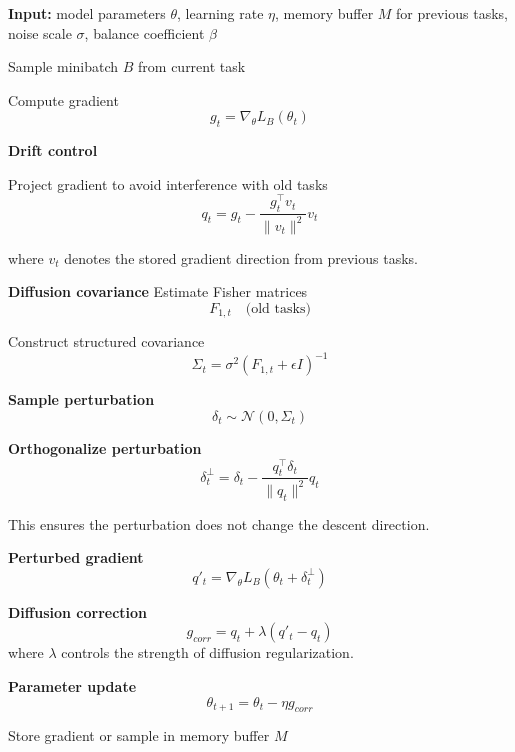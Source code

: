 \documentclass{article}
\begin{document}



\begin{algorithm}[t]
\caption{Drift–Diffusion Controlled Continual Learning (Perturbation Form)}
\label{alg:ddcl}
\begin{algorithmic}[1]

\STATE \textbf{Input:}
model parameters $\theta$,
learning rate $\eta$,
memory buffer $M$ for previous tasks,
noise scale $\sigma$,
balance coefficient $\beta$


\STATE Sample minibatch $B$ from current task

\STATE Compute gradient
\[
g_t = \nabla_\theta L_B(\theta_t)
\]

\STATE \textbf{Drift control}

Project gradient to avoid interference with old tasks
\[
q_t = g_t -
\frac{g_t^\top v_t}{\|v_t\|^2} v_t
\]

where $v_t$ denotes the stored gradient direction from previous tasks.

\STATE \textbf{Diffusion covariance}
Estimate Fisher matrices
\[
F_{1,t} \quad \text{(old tasks)}
\]


Construct structured covariance
\[
\Sigma_t =
\sigma^2 (F_{1,t}+\epsilon I)^{-1}
\]

\STATE \textbf{Sample perturbation}
\[
\delta_t \sim \mathcal N(0,\Sigma_t)
\]

\STATE \textbf{Orthogonalize perturbation}
\[
\delta_t^\perp
=
\delta_t -
\frac{q_t^\top \delta_t}{\|q_t\|^2} q_t
\]

This ensures the perturbation does not change the descent direction.

\STATE \textbf{Perturbed gradient}
\[
q'_t = \nabla_\theta L_B(\theta_t+\delta_t^\perp)
\]

\STATE \textbf{Diffusion correction}
\[
g_{corr}
=
q_t + \lambda (q'_t-q_t)
\]
where $\lambda$ controls the strength of diffusion regularization.

\STATE \textbf{Parameter update}
\[
\theta_{t+1}
=
\theta_t
-
\eta g_{corr}
\]

\STATE Store gradient or sample in memory buffer $M$

\ENDFOR

\end{algorithmic}
\end{algorithm}
\end{document}
